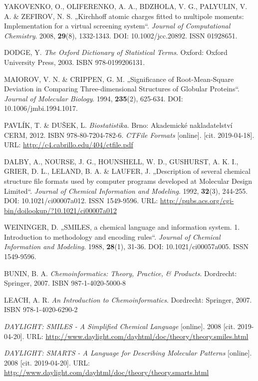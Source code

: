 \begin{thebibliography}{10}
YAKOVENKO, O., OLIFERENKO, A. A., BDZHOLA, V. G., PALYULIN, V. A. \& ZEFIROV, N. S. „Kirchhoff atomic charges fitted to multipole moments: Implementation for a virtual screening system“. \textit{Journal of Computational Chemistry}. 2008, \textbf{29}(8), 1332-1343. DOI: 10.1002/jcc.20892. ISSN 01928651.

DODGE, Y. \textit{The Oxford Dictionary of Statistical Terms}. Oxford: Oxford University Press, 2003. ISBN 978-0199206131.

MAIOROV, V. N. \& CRIPPEN, G. M. „Significance of Root-Mean-Square Deviation in Comparing Three-dimensional Structures of Globular Proteins“. \textit{Journal of Molecular Biology}. 1994, \textbf{235}(2), 625-634. DOI: 10.1006/jmbi.1994.1017. 

PAVLÍK, T. \& DUŠEK, L. \textit{Biostatistika}. Brno: Akademické nakladatelství CERM, 2012. ISBN 978-80-7204-782-6.
\textit{CTFile Formats} [online]. [cit. 2019-04-18]. URL: \url{http://c4.cabrillo.edu/404/ctfile.pdf}

DALBY, A., NOURSE, J. G., HOUNSHELL, W. D., GUSHURST, A. K. I., GRIER, D. L., LELAND, B. A. \& LAUFER, J. „Description of several chemical structure file formats used by computer programs developed at Molecular Design Limited“. \textit{Journal of Chemical Information and Modeling}. 1992, \textbf{32}(3), 244-255. DOI: 10.1021/ci00007a012. ISSN 1549-9596. URL: \url{http://pubs.acs.org/cgi-bin/doilookup/?10.1021/ci00007a012}

WEININGER, D. „SMILES, a chemical language and information system. 1. Introduction to methodology and encoding rules“. \textit{Journal of Chemical Information and Modeling}. 1988, \textbf{28}(1), 31-36. DOI: 10.1021/ci00057a005. ISSN 1549-9596.

BUNIN, B. A. \textit{Chemoinformatics: Theory, Practice, \& Products}. Dordrecht: Springer, 2007. ISBN 987-1-4020-5000-8

LEACH, A. R. \textit{An Introduction to Chemoinformatics}. Dordrecht: Springer, 2007. ISBN 978-1-4020-6290-2

\textit{DAYLIGHT: SMILES - A Simplified Chemical Language} [online]. 2008 [cit. 2019-04-20]. URL: \url{ http://www.daylight.com/dayhtml/doc/theory/theory.smiles.html}

\textit{DAYLIGHT: SMARTS - A Language for Describing Molecular Patterns} [online]. 2008 [cit. 2019-04-20]. URL: \url{ http://www.daylight.com/dayhtml/doc/theory/theory.smarts.html}


\end{thebibliography}
